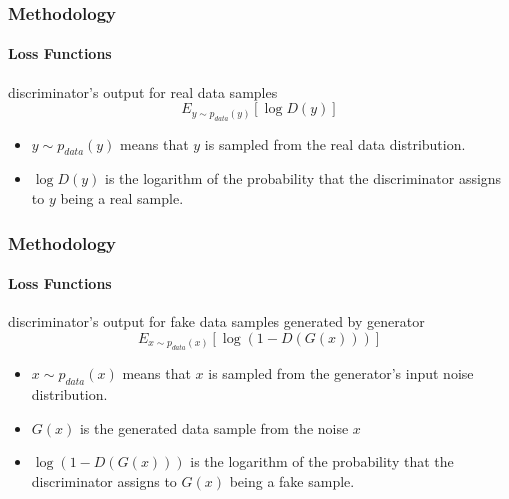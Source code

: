 \documentclass[aspectratio=169, lecture, amberg]{OTHAWbeamer}
\begin{document}
\begin{frame}[t]
    \frametitle{Methodology}
    \framesubtitle{Loss Functions}

    \begin{block}{discriminator's output for real data samples}
        \[
        E_{y \sim p_{data}(y)}[\log D(y)]
        \]
    \end{block}
    \vspace{0.6cm}
    
    \begin{itemize}
        \item \(y \sim p_{data}(y)\) means that \(y\) is sampled from the real data distribution.
        \vspace{0.6cm}
        \item \(\log D(y)\) is the logarithm of the probability that the discriminator assigns to \(y\) being a real sample.
    \end{itemize}

\end{frame}
\begin{frame}[t]
    \frametitle{Methodology}
    \framesubtitle{Loss Functions}

    \begin{block}{discriminator's output for fake data samples generated by generator}
        \[
        E_{x \sim p_{data}(x)}[\log (1 - D(G(x)))]
        \]
    \end{block}
    \vspace{0.6cm}
    
    \begin{itemize}
        \item \(x \sim p_{data}(x)\) means that \(x\) is sampled from the generator's input noise distribution.
        \vspace{0.6cm}
        \item \(G(x)\) is the generated data sample from the noise \(x\)
        \vspace{0.6cm}
        \item \(\log (1 - D(G(x)))\) is the logarithm of the probability that the discriminator assigns to \(G(x)\) being a fake sample.

    \end{itemize}

\end{frame}
\end{document}
